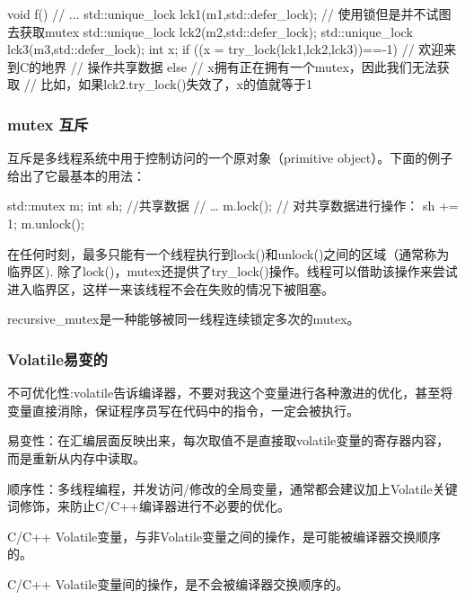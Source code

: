 \begin{Code}
	void f(){
		// ...
		std::unique_lock lck1(m1,std::defer_lock); // 使用锁但是并不试图去获取mutex
		std::unique_lock lck2(m2,std::defer_lock);
		std::unique_lock lck3(m3,std::defer_lock);
		int x;
		if ((x = try_lock(lck1,lck2,lck3))==-1) { // 欢迎来到C的地界
			// 操作共享数据
		}
		else {
			// x拥有正在拥有一个mutex，因此我们无法获取
			// 比如，如果lck2.try_lock()失效了，x的值就等于1
		}
	}
\end{Code}

\subsubsection{mutex 互斥}
互斥是多线程系统中用于控制访问的一个原对象（primitive object）。下面的例子给出了它最基本的用法：

\begin{Code}
	std::mutex  m;
	int sh; //共享数据
	// …
	m.lock();
	// 对共享数据进行操作：
	sh += 1;
	m.unlock();
\end{Code}
在任何时刻，最多只能有一个线程执行到lock()和unlock()之间的区域（通常称为临界区). 除了lock()，mutex还提供了try_lock()操作。线程可以借助该操作来尝试进入临界区，这样一来该线程不会在失败的情况下被阻塞。

recursive_mutex是一种能够被同一线程连续锁定多次的mutex。

\subsubsection{Volatile易变的}
不可优化性:volatile告诉编译器，不要对我这个变量进行各种激进的优化，甚至将变量直接消除，保证程序员写在代码中的指令，一定会被执行。

易变性：在汇编层面反映出来，每次取值不是直接取volatile变量的寄存器内容，而是重新从内存中读取。

顺序性：多线程编程，并发访问/修改的全局变量，通常都会建议加上Volatile关键词修饰，来防止C/C++编译器进行不必要的优化。

C/C++ Volatile变量，与非Volatile变量之间的操作，是可能被编译器交换顺序的。

C/C++ Volatile变量间的操作，是不会被编译器交换顺序的。